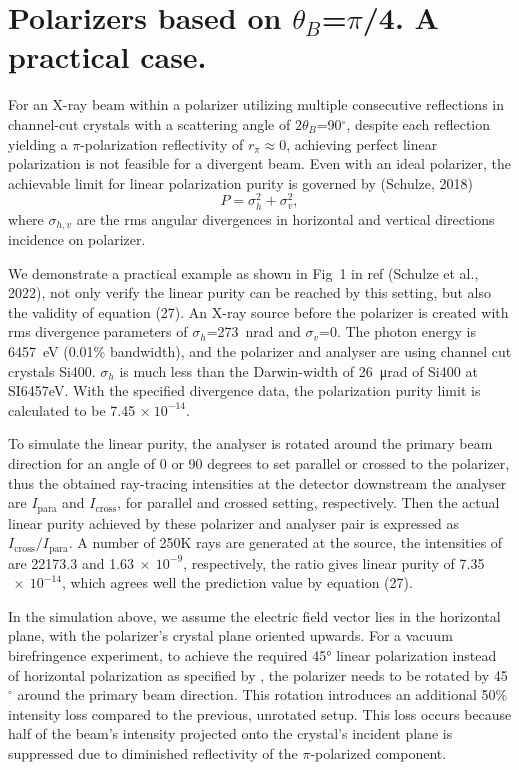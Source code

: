 \documentclass{iucr}
\begin{document}
\section{Polarizers based on $\theta_B$=$\pi$/4. A practical case.}\label{sec:polarizers45degPractical}

For an X-ray beam within a polarizer utilizing multiple consecutive reflections in channel-cut crystals with a scattering angle of $2\theta_B$=90$^\circ$, despite each reflection yielding a $\pi$-polarization reflectivity of $r_\pi\approx 0$, achieving perfect linear polarization is not feasible for a divergent beam.
Even with an ideal polarizer, the achievable limit for linear polarization purity is governed by (Schulze, 2018)
\begin{equation}\label{eq:polarizer}
    P = \sigma_h^2 + \sigma_v^2,
\end{equation}
where $\sigma_{h,v}$ are the rms angular divergences in horizontal and vertical directions incidence on polarizer.

We demonstrate a practical example as shown in Fig~1 in ref (Schulze et al., 2022), not only verify the linear purity can be reached by this setting, but also the validity of equation (27).
An X-ray source before the polarizer is created with rms divergence parameters of $\sigma_h$=273~nrad and $\sigma_v$=0.
The photon energy is \SI{6457}{eV} (0.01\% bandwidth), and the polarizer and analyser are using channel cut crystals Si400.
$\sigma_h$ is much less than the Darwin-width of \SI{26}{\micro\radian} of Si400 at SI{6457}{eV}.
With the specified divergence data, the polarization purity limit is calculated to be 7.45 $\times~10^{-14}$.

To simulate the linear purity, the analyser is rotated around the primary beam direction for an angle of 0 or 90 degrees to set parallel or crossed to the polarizer, thus the obtained ray-tracing intensities at the detector downstream the analyser are $I_\text{para}$ and $I_\text{cross}$, for parallel and crossed setting, respectively.
Then the actual linear purity achieved by these polarizer and analyser pair is expressed as $I_\text{cross}/I_\text{para}$.
A number of 250K rays are generated at the source, the intensities of  are 22173.3 and 1.63$~\times~10^{-9}$, respectively, the ratio gives linear purity of 7.35$~\times~10^{-14}$, which agrees well the prediction value by equation (27).

In the simulation above, we assume the electric field vector lies in the horizontal plane, with the polarizer’s crystal plane oriented upwards.
For a vacuum birefringence experiment, to achieve the required 45° linear polarization instead of horizontal polarization as specified by \cite{Shen2018}, the polarizer needs to be rotated by 45$^\circ$ around the primary beam direction.
This rotation introduces an additional 50\% intensity loss compared to the previous, unrotated setup.
This loss occurs because half of the beam’s intensity projected onto the crystal’s incident plane is suppressed due to diminished reflectivity of the $\pi$-polarized component.
\end{document}
